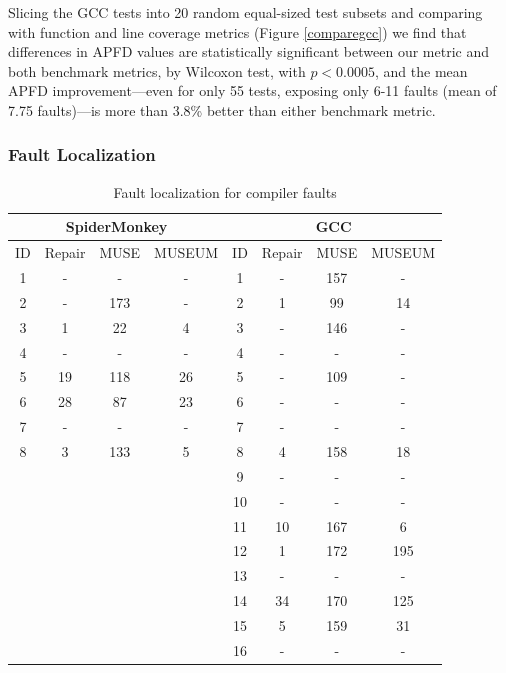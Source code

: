 Slicing the GCC tests into 20 random equal-sized test subsets and comparing with function and line coverage metrics (Figure \ref{comparegcc}) we find that differences in APFD values are statistically significant between our metric and both benchmark metrics, by Wilcoxon test, with $p < 0.0005$, and the mean APFD improvement---even for only 55 tests, exposing only 6-11 faults (mean of 7.75 faults)---is more than 3.8\% better than either benchmark metric.


\subsubsection{Fault Localization}

\begin{table}
\caption{Fault localization for compiler faults}
\centering
{\scriptsize
\begin{tabular}{|c||c|c|c||c||c|c|c|}
\hline
\multicolumn{4}{|c||}{SpiderMonkey}&\multicolumn{4}{|c|}{GCC}\\
\hline
ID& Repair & MUSE & MUSEUM & ID & Repair & MUSE & MUSEUM \\
\hline
1 & - & - & - &         1 & - & 157 & -\\
2 & - & 173 & - &     2 & 1 & 99 & 14\\
3 & 1 & 22 & 4 &       3 & - & 146 & -\\
4 & - & - & - &         4 &  - & - & -\\
5 & 19 & 118 & 26 & 5 & - & 109 & -\\
6 & 28 & 87 & 23 &   6 & - & - & -\\
7 & - & - & - &         7 & - & - & -\\
8 & 3 & 133 & 5 &     8 & 4 & 158 & 18\\
& & & & 9 & - & - & -\\
& & & & 10 & - & - & -\\
& & & & 11 & 10 & 167 & 6\\
& & & & 12 & 1 & 172 & 195\\
& & & & 13 & - & - & -\\
& & & & 14 & 34 & 170 & 125\\
& & & & 15 &  5 & 159 & 31\\
& & & & 16 & - & - & -\\
\hline
\end{tabular}
}
\label{bothtable}
\end{table}

